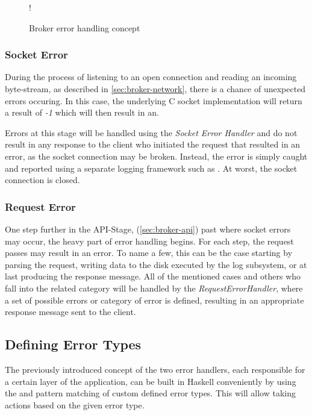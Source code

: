 \begin{figure}[H]
  \centering
   {!} {
    
  }
  \caption{Broker error handling concept}
  \label{fig:broker-error-activity}
\end{figure}

\subsubsection{Socket Error}

During the process of listening to an open connection and reading an incoming
byte-stream, as described in \ref{sec:broker-network}, there is a chance of
unexpected errors occuring. In this case, the underlying C socket implementation will return a result of \textit{-1} which will then result in an. 

Errors at this stage will be handled using the \textit{Socket Error Handler} and
do not result in any response to the client who initiated the request that
resulted in an error, as the socket connection may be broken. Instead, the error is
simply caught and reported using a separate logging framework such
as . At worst, the
socket connection is closed.

\subsubsection{Request Error}

One step further in the API-Stage, (\ref{sec:broker-api}) past where socket errors
may occur, the heavy part of error handling begins. For each step,
the request passes may result in an error. To name a few, this can be the case
starting by parsing the request,  writing data to the disk executed by the log
subsystem, or at last producing the response message. All of the
mentioned cases and others who fall into the related category will be handled by
the \textit{RequestErrorHandler}, where a set of possible errors or category of
error is defined, resulting in an appropriate response message sent to the client.


\subsection{Defining Error Types}

The previously introduced concept of the two error handlers, each responsible
for a certain layer of the application, can be built in Haskell 
conveniently by using the 
and pattern matching of custom defined error types. This will allow taking
actions based on the given error type.  

